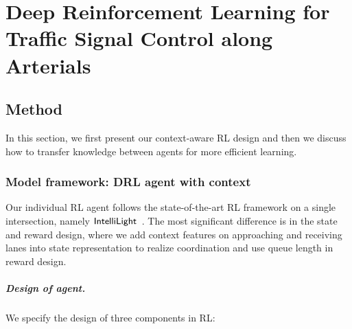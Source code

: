 \chapter{Deep Reinforcement Learning for Traffic Signal Control along Arterials}
\label{chap:arterial}

\section{Method}

In this section, we first present our context-aware RL design and then we discuss how to transfer knowledge between agents for more efficient learning.

\subsection{Model framework: DRL agent with context}
\label{sec:agent-design}

Our individual RL agent follows the state-of-the-art RL framework on a single intersection, namely $\textsf{IntelliLight}$~\cite{wei2018intellilight}. The most significant difference is in the state and reward design, where we add context features on approaching and receiving lanes into state representation to realize coordination and use queue length in reward design.

\paragraph{Design of agent.}We specify the design of three components in RL:

